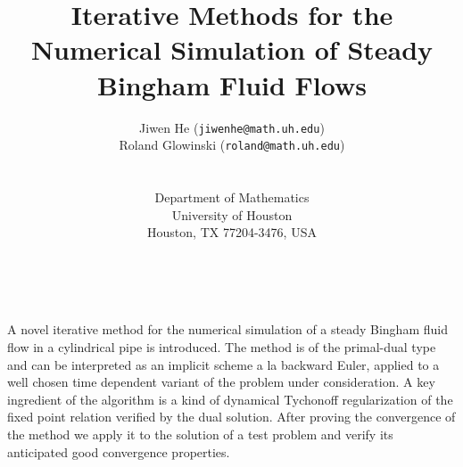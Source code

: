 \documentclass[11pt]{article}
\date{ ~ \hspace{-4mm}}
\title{Iterative Methods for the Numerical Simulation of Steady Bingham Fluid Flows  }
\author{Jiwen He ({\tt jiwenhe@math.uh.edu}) \\ Roland Glowinski ({\tt roland@math.uh.edu}) \\ \\ \\ Department of Mathematics \\ University of Houston \\ Houston, TX 77204-3476, USA}
\begin{document}
\maketitle
\thispagestyle{empty}





 



A novel iterative method for
the numerical simulation of a steady Bingham fluid flow in a cylindrical 
pipe is introduced. The method is of the primal-dual type and can be
interpreted
 as an
implicit scheme a la backward Euler, applied to a well chosen time 
dependent variant of the problem under consideration. A key ingredient of 
the algorithm is a kind of dynamical Tychonoff regularization of the fixed 
point relation verified by the dual solution.
After proving the convergence of the method we apply it to the solution of 
a test problem and verify its anticipated good convergence properties.
\end{document}
